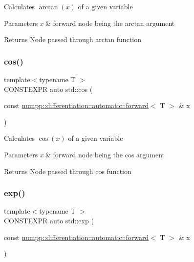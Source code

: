 Calculates $\arctan(x)$ of a given variable 
\begin{DoxyParams}{Parameters}
{\em x} & forward node being the arctan argument \\
\hline
\end{DoxyParams}
\begin{DoxyReturn}{Returns}
Node passed through arctan function
\end{DoxyReturn}
\mbox{\label{group__numpp__differentiation__forward__automatic_gaa5a06320f93037d94fda441546d7d690}} 
\subsubsection{\texorpdfstring{cos()}{cos()}}
{\footnotesize\ttfamily template$<$typename T $>$ \\
C\+O\+N\+S\+T\+E\+X\+PR auto std\+::cos (\begin{DoxyParamCaption}\item[{const \hyperlink{classnumpp_1_1differentiation_1_1automatic_1_1forward}{numpp\+::differentiation\+::automatic\+::forward}$<$ T $>$ \&}]{x }\end{DoxyParamCaption})}

Calculates $\cos(x)$ of a given variable 
\begin{DoxyParams}{Parameters}
{\em x} & forward node being the cos argument \\
\hline
\end{DoxyParams}
\begin{DoxyReturn}{Returns}
Node passed through cos function
\end{DoxyReturn}
\mbox{\label{group__numpp__differentiation__forward__automatic_gab45ba058e4fd16d0f9f4c26426e385f9}} 
\subsubsection{\texorpdfstring{exp()}{exp()}}
{\footnotesize\ttfamily template$<$typename T $>$ \\
C\+O\+N\+S\+T\+E\+X\+PR auto std\+::exp (\begin{DoxyParamCaption}\item[{const \hyperlink{classnumpp_1_1differentiation_1_1automatic_1_1forward}{numpp\+::differentiation\+::automatic\+::forward}$<$ T $>$ \&}]{x }\end{DoxyParamCaption})}

